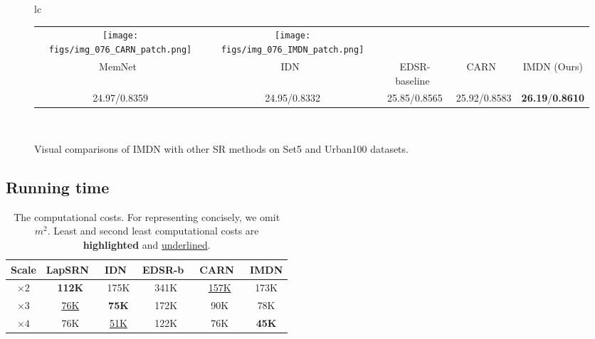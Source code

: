 \documentclass[sigconf]{acmart}
\begin{document}
\begin{figure*}[htpb]
{\begin{tabular}{lc}
\begin{adjustbox}{valign=t}
\begin{tabular}{ccccc}
					\hspace{-3mm}
					\texttt{[image: figs/img\_076\_CARN\_patch.png]} &
					\hspace{-3mm}
					\texttt{[image: figs/img\_076\_IMDN\_patch.png]} \\
					MemNet~\cite{MemNet} & \hspace{-3mm}
					IDN~\cite{IDN} & \hspace{-3mm}
					EDSR-baseline~\cite{EDSR} & \hspace{-3mm}
					CARN~\cite{CARN} & \hspace{-3mm}
					IMDN (Ours) \\
					24.97/0.8359 & \hspace{-3mm}
					24.95/0.8332 & \hspace{-3mm}
					25.85/0.8565 & \hspace{-3mm}
					25.92/0.8583 & \hspace{-3mm}
					\textbf{26.19}/\textbf{0.8610} \\
				\end{tabular}
			\end{adjustbox}
			\\
			
	\end{tabular} }
	\vspace{-3mm}
	\caption{Visual comparisons of IMDN with other SR methods on Set5 and Urban100 datasets.}
	\label{fig:visual-comparison}
\end{figure*}

\subsection{Running time}

\begin{table}[htpb]
	\centering
	\small
	\vspace{-3mm}
	\caption{The computational costs. For representing concisely, we omit $m^{2}$. Least and second least computational costs are \textbf{highlighted} and \underline{underlined}.}
	\label{tab:computational-costs}
	\begin{tabular}{|c|c|c|c|c|c|}
		\hline
		Scale & LapSRN~\cite{LapSRN} & IDN~\cite{IDN} & EDSR-b~\cite{EDSR} & CARN~\cite{CARN} & IMDN \\
		\hline
		\hline
		$\times 2$ & \textbf{112K} & 175K & 341K & \underline{157K} & 173K \\
		$\times 3$ & \underline{76K} & \textbf{75K} & 172K & 90K & 78K \\
		$\times 4$ & 76K & \underline{51K} & 122K & 76K & \textbf{45K} \\
		\hline
	\end{tabular}
\end{table}
\end{document}
